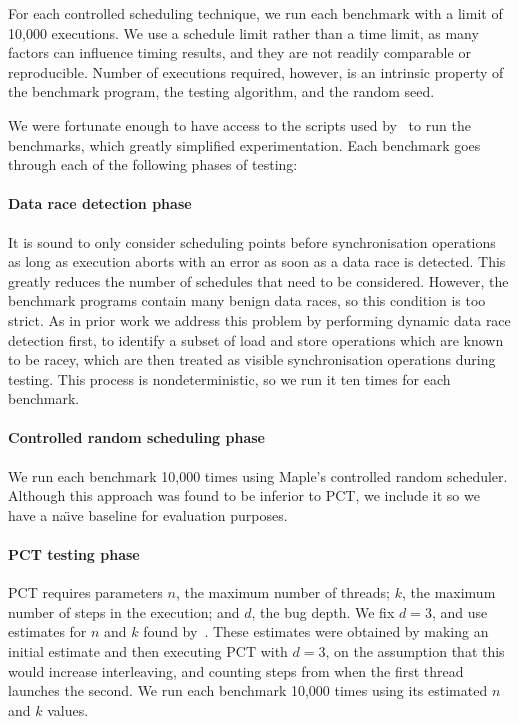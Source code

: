 For each controlled scheduling technique, we run each benchmark with a limit of
10,000 executions.  We use a schedule limit rather than a time limit, as many
factors can influence timing results, and they are not readily comparable or
reproducible.  Number of executions required, however, is an intrinsic property
of the benchmark program, the testing algorithm, and the random seed.

We were fortunate enough to have access to the scripts used
by~\cite{thomson2016,thomson2014} to run the benchmarks, which greatly
simplified experimentation.  Each benchmark goes through each of the
following phases of testing:

\paragraph{Data race detection phase}
It is sound to only consider scheduling points before synchronisation operations
as long as execution aborts with an error as soon as a data race is
detected\cite{musuvathi2008}.  This greatly reduces the number of schedules that
need to be considered.  However, the benchmark programs contain many benign data
races\cite{thomson2016}, so this condition is too strict.  As in prior
work\cite{thomson2016,thomson2014,yu2012} we address this problem by performing
dynamic data race detection first, to identify a subset of load and store
operations which are known to be racey, which are then treated as visible
synchronisation operations during testing.  This process is nondeterministic, so
we run it ten times for each benchmark.

\paragraph{Controlled random scheduling phase}
We run each benchmark 10,000 times using Maple's controlled random scheduler.  Although
this approach was found to be inferior to PCT\cite{thomson2016}, we include it
so we have a na\"{\i}ve baseline for evaluation purposes.

\paragraph{PCT testing phase}
PCT requires parameters $n$, the maximum number of threads; $k$, the maximum
number of steps in the execution; and $d$, the bug depth.  We fix $d=3$, and use
estimates for $n$ and $k$ found by~\cite{thomson2016}.  These estimates were
obtained by making an initial estimate and then executing PCT with $d=3$, on the
assumption that this would increase interleaving, and counting steps from when
the first thread launches the second.  We run each benchmark 10,000 times using
its estimated $n$ and $k$ values.

